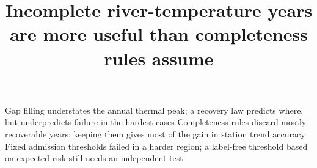 \documentclass[draft]{agujournal2025}
\begin{document}

\title{Incomplete river-temperature years are more useful than completeness rules assume}


\keypoints
  {Gap filling understates the annual thermal peak; a recovery law predicts where, but underpredicts failure in the hardest cases}
  {Completeness rules discard mostly recoverable years; keeping them gives most of the gain in station trend accuracy}
  {Fixed admission thresholds failed in a harder region; a label-free threshold based on expected risk still needs an independent test}

\maketitle\par
\end{document}
